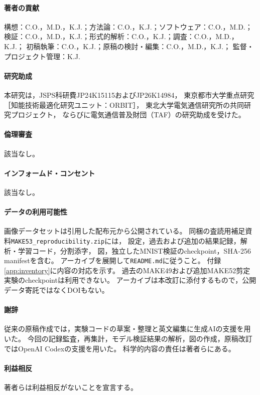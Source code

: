 \documentclass[11pt,a4paper]{ltjsarticle}
\begin{document}
\paragraph{著者の貢献}
構想：C.O.，M.D.，K.J.；方法論：C.O.，K.J.；ソフトウェア：C.O.，M.D.；
検証：C.O.，M.D.，K.J.；形式的解析：C.O.，K.J.；調査：C.O.，M.D.，K.J.；
初稿執筆：C.O.，K.J.；原稿の検討・編集：C.O.，M.D.，K.J.；
監督・プロジェクト管理：K.J.
\paragraph{研究助成}
本研究は，JSPS科研費JP24K15115およびJP26K14984，
東京都市大学重点研究［知能技術最適化研究ユニット：ORBIT］，
東北大学電気通信研究所の共同研究プロジェクト，
ならびに電気通信普及財団（TAF）の研究助成を受けた。
\paragraph{倫理審査}該当なし。
\paragraph{インフォームド・コンセント}該当なし。
\paragraph{データの利用可能性}
画像データセットは引用した配布元から公開されている。
同梱の査読用補足資料\texttt{MAKE53\_reproducibility.zip}には，
設定，過去および追加の結果記録，解析・学習コード，分割添字，
図，独立したMNIST検証のcheckpoint，SHA-256 manifestを含む。
アーカイブを展開して\texttt{README.md}に従うこと。
付録\ref{app:inventory}に内容の対応を示す。
過去のMAKE49および追加MAKE52剪定実験のcheckpointは利用できない。
アーカイブは本改訂に添付するもので，公開データ寄託ではなくDOIもない。
\paragraph{謝辞}
従来の原稿作成では，実験コードの草案・整理と英文編集に生成AIの支援を用いた。
今回の記録監査，再集計，モデル検証結果の解析，図の作成，原稿改訂ではOpenAI Codexの支援を用いた。
科学的内容の責任は著者らにある。
\paragraph{利益相反}著者らは利益相反がないことを宣言する。

\clearpage
\appendix
\end{document}
